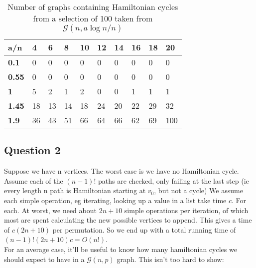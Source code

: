 \documentclass[10pt,a4paper]{report}
\begin{document}
\begin{table}[h]
\centering
\begin{tabular}{|l|l|l|l|l|l|l|l|l|l|}
\hline
\textbf{a/n}  & \textbf{4} & \textbf{6} & \textbf{8} & \textbf{10} & \textbf{12} & \textbf{14} & \textbf{16} & \textbf{18} & \textbf{20} \\ \hline
\textbf{0.1}  & 0          & 0          & 0          & 0           & 0           & 0           & 0           & 0           & 0           \\ \hline
\textbf{0.55} & 0          & 0          & 0          & 0           & 0           & 0           & 0           & 0           & 0           \\ \hline
\textbf{1}    & 5          & 2          & 1          & 2           & 0           & 0           & 1           & 1           & 1           \\ \hline
\textbf{1.45} & 18         & 13         & 14         & 18          & 24          & 20          & 22          & 29          & 32          \\ \hline
\textbf{1.9}  & 36         & 43         & 51         & 66          & 64          & 66          & 62          & 69          & 100         \\ \hline
\end{tabular}
\caption{Number of graphs containing Hamiltonian cycles from a selection of 100 taken from $
\mathcal{G}(n,a\log{n}/n)$}
\label{tab:my-table}
\end{table}

\subsection*{Question 2}
Suppose we have n vertices. The worst case is we have no Hamiltonian cycle. Assume each of the $(n-1)!$ paths are checked, only failing at the last step (ie every length n path is Hamiltonian starting at $v_0$, but not a cycle) We assume each simple operation, eg iterating, looking up a value in a list take time $c$. For each. At worst, we need about $2n+10$ simple operations per iteration, of which most are spent calculating the new possible vertices to append. This gives a time of $c(2n+10)$ per permutation. So we end up with a total running time of $(n-1)!(2n+10)c = O(n!)$.\\

For an average case, it'll be useful to know how many hamiltonian cycles we should expect to have in a $\mathcal{G}(n,p)$ graph. This isn't too hard to show:
\end{document}
